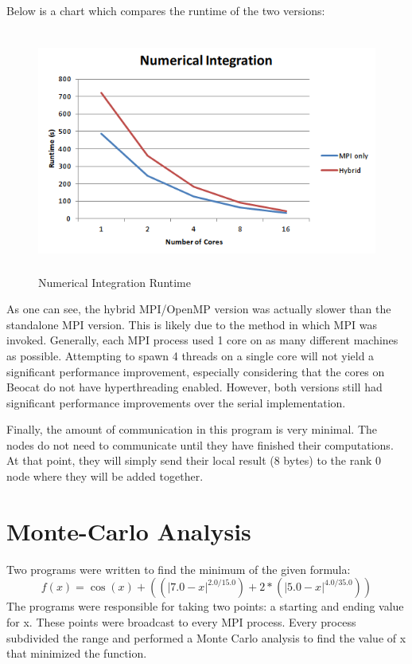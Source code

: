 \documentclass[notitlepage, letterpaper, 12pt]{report}
\begin{document}
Below is a chart which compares the runtime of the two versions:

\begin{figure}[H]
	\includegraphics[width=\linewidth,height=8cm,keepaspectratio]{q1.png}
	\caption[Numerical Integration Runtime]{Numerical Integration Runtime}
	\label{fig:arch}
\end{figure}

As one can see, the hybrid MPI/OpenMP version was actually slower than the standalone MPI version. This is likely due to the method in which
MPI was invoked. Generally, each MPI process used 1 core on as many different machines as possible. Attempting to spawn 4 threads on a single core will
not yield a significant performance improvement, especially considering that the cores on Beocat do not have hyperthreading enabled. However, both versions
still had significant performance improvements over the serial implementation. 

Finally, the amount of communication in this program is very minimal. The nodes do not need to communicate until they have finished their computations. At that point,
they will simply send their local result (8 bytes) to the rank 0 node where they will be added together. 

\section*{Monte-Carlo Analysis}
Two programs were written to find the minimum of the given formula:
\[f(x) = \cos(x)+((\lvert7.0-x\rvert^{2.0/15.0}) + 2*(\lvert5.0-x\rvert^{4.0/35.0})) \]
The programs were responsible for taking two points: a starting and ending value for x.  These points were broadcast to every MPI process.  Every process subdivided the range and performed a Monte Carlo analysis to find the value of x that minimized the function.
\end{document}

